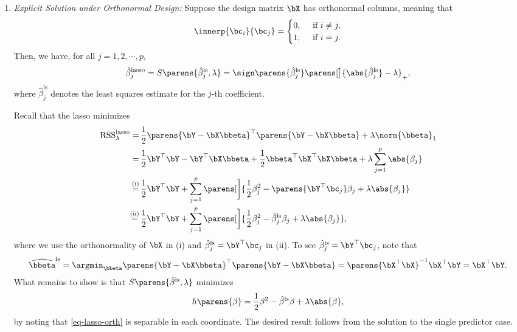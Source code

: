 \documentclass[12pt]{article}
\begin{document}
\begin{enumerate}[label=\textbf{\arabic*.}]
\begin{enumerate}
		\item \textit{Explicit Solution under Orthonormal Design:} Suppose the design matrix $\bX$ has orthonormal columns, meaning that 
		\begin{align*}
			\innerp{\bc_i}{\bc_j} = \begin{cases}
				0, & \, \text{ if } i \neq j, \\ 
				1, & \, \text{ if } i = j. 
			\end{cases}
		\end{align*}
		Then, we have, for all $j = 1, 2, \cdots, p$, 
		\begin{align}\label{eq-lasso-orth-sol}
			\hat{\beta}_j^{\mathrm{lasso}} = S \parens{\hat{\beta}_j^{\mathrm{ls}}, \lambda} = \sign \parens{\hat{\beta}_j^{\mathrm{ls}}} \parens[\big]{\abs{\hat{\beta}_j^{\mathrm{ls}}} - \lambda}_+, 
		\end{align}
		where $\hat{\beta}_j^{\mathrm{ls}}$ denotes the least squares estimate for the $j$-th coefficient. 
		
		Recall that the lasso minimizes 
		\begin{align}
			\mathrm{RSS}_{\lambda}^{\mathrm{lasso}} = & \, \frac{1}{2} \parens{\bY - \bX \bbeta}^\top \parens{\bY - \bX \bbeta} + \lambda \norm{\bbeta}_1 \nonumber \\ 
			= & \, \frac{1}{2} \bY^\top \bY - \bY^\top \bX \bbeta + \frac{1}{2} \bbeta^\top \bX^\top \bX \bbeta + \lambda \sum_{j=1}^p \abs{\beta_j} \nonumber \\ 
			\stackrel{(\mathrm{i})}{=} & \, \frac{1}{2} \bY^\top \bY + \sum_{j=1}^p \parens[\bigg]{\frac{1}{2} \beta_j^2 - \parens{\bY^\top \bc_j} \beta_j + \lambda \abs{\beta_j}} \nonumber \\ 
			\stackrel{(\mathrm{ii})}{=} & \, \frac{1}{2} \bY^\top \bY + \sum_{j=1}^p \parens[\bigg]{\frac{1}{2} \beta_j^2 - \hat{\beta}_j^{\mathrm{ls}} \beta_j + \lambda \abs{\beta_j}}, \label{eq-lasso-orth}
		\end{align}
		where we use the orthonormality of $\bX$ in (i) and $\hat{\beta}_j^{\mathrm{ls}} = \bY^\top \bc_j$ in (ii). To see $\hat{\beta}_j^{\mathrm{ls}} = \bY^\top \bc_j$, note that 
		\begin{align*}
			\widehat{\bbeta}^{\mathrm{ls}} = \argmin_{\bbeta} \parens{\bY - \bX \bbeta}^\top \parens{\bY - \bX \bbeta} = \parens{\bX^\top \bX}^{-1} \bX^\top \bY = \bX^\top \bY. 
		\end{align*}
		What remains to show is that $S \parens{\hat{\beta}^{\mathrm{ls}}, \lambda}$ minimizes 
		\begin{align*}
			h \parens{\beta} = \frac{1}{2} \beta^2 - \hat{\beta}^{\mathrm{ls}} \beta + \lambda \abs{\beta}, 
		\end{align*}
		by noting that \eqref{eq-lasso-orth} is separable in each coordinate. The desired result follows from the solution to the single predictor case.  
		

\end{enumerate}
\end{enumerate}
\end{document}
